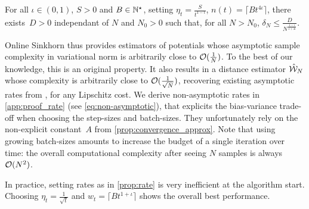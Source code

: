 \begin{proposition}\label{prop:rate}
    For all $\iota \in (0, 1)$, $S > 0$ and $B \in \mathbb{N}^\star$, setting $\eta_t =
    \frac{S}{t^{1 - \iota}}$, $n(t) = \lceil B t^{4\iota} \rceil$, there
    exists~$D > 0$ independant of $N$ and $N_0 > 0$ such that, for all $N >
    N_0$, $\delta_N \leq \frac{D}{N^{\frac{1 - \iota}{1 + 4 \iota}}}$.
\end{proposition}

Online Sinkhorn thus provides estimators of potentials whose asymptotic sample
complexity in variational norm is arbitrarily close to $\mathcal{O}(\frac{1}{N})$. To
the best of our knowledge, this is an original property. It also results in a distance estimator $\hat {\mathcal{W}}_N$ whose
complexity is arbitrarily close to $\mathcal{O}(\frac{1}{\sqrt{N}})$, recovering
existing asymptotic rates from \cite{2019-Genevay-aistats}, for any Lipschitz cost. We derive non-asymptotic rates in \autoref{app:proof_rate} (see \eqref{eq:non-asymptotic}), that explicits the
bias-variance trade-off when choosing the step-sizes and batch-sizes. They
unfortunately rely on the non-explicit constant~$A$ from
\autoref{prop:convergence_approx}. Note that using growing batch-sizes amounts
to increase the budget of a single iteration over time: the overall
computational complexity after seeing $N$ samples is always $\mathcal{O}(N^2)$.

In practice, setting rates as in
\autoref{prop:rate} is very inefficient at the algorithm start. Choosing $\eta_t = \frac{1}{\sqrt{t}}$ and $w_t = \lceil B t^{1 + \iota} \rceil$
shows the overall best performance.

